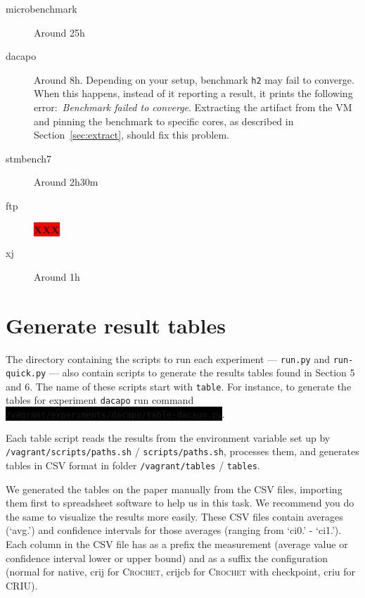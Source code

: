 \documentclass[12pt]{article}
\newcommand{\command}[1]{\colorbox{black}{\texttt{\color{white}#1}}}
\newcommand{\host}[1]{\colorbox{blue!20}{\texttt{\color{black}#1}}}
\newcommand{\vm}[1]{\colorbox{green!20}{\texttt{\color{black}#1}}}
\newcommand{\XXX}{\colorbox{red}{\bf\color{white}XXX}}
\newcommand{\sysname}{\textsc{Crochet}\xspace}
\begin{document}
\begin{description}

    \item[microbenchmark] Around 25h

    \item[dacapo] Around 8h.  Depending on your setup, benchmark \texttt{h2} may
        fail to converge.  When this happens, instead of it reporting a result,
        it prints the following error:~\emph{Benchmark failed to converge}.
        Extracting the artifact from the VM and pinning the benchmark to
        specific cores, as described in Section~\ref{sec:extract}, should fix
        this problem.

    \item[stmbench7] Around 2h30m

    \item[ftp] \XXX

    \item[xj] Around 1h

\end{description}

\section{Generate result tables}
\label{sec:tables}

The directory containing the scripts to run each experiment --- \texttt{run.py}
and \texttt{run-quick.py} --- also contain scripts to generate the results
tables found in Section 5 and 6.  The name of these scripts start with
\texttt{table}.  For instance, to generate the tables for experiment
\texttt{dacapo} run command\linebreak
\command{/vagrant/experiments/dacapo/table-dacapo.py}.

Each table script reads the results from the environment variable set up by
\vm{/vagrant/scripts/paths.sh} / \host{scripts/paths.sh}, processes them, and
generates tables in CSV format in folder \vm{/vagrant/tables} / \host{tables}.

We generated the tables on the paper manually from the CSV files, importing them
first to spreadsheet software to help us in this task.  We recommend you do the
same to visualize the results more easily. These CSV files contain averages (`avg.') and confidence intervals for those averages (ranging from `ci0.' - `ci1.'). Each column in the CSV file has as a prefix the measurement (average value or confidence interval lower or upper bound) and as a suffix the configuration (normal for native, crij for \sysname, crijcb for \sysname with checkpoint, criu for CRIU).
\end{document}
